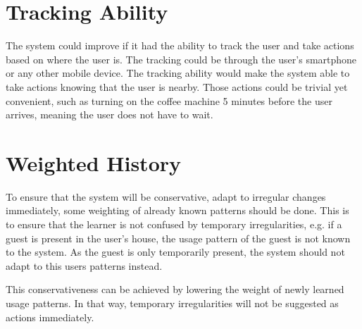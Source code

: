 \section{Tracking Ability}
The system could improve if it had the ability to track the user and take actions based on where the user is. The tracking could be through the user's smartphone or any other mobile device. The tracking ability would make the system able to take actions knowing that the user is nearby. Those actions could be trivial yet convenient, such as turning on the coffee machine 5 minutes before the user arrives, meaning the user does not have to wait.

\section{Weighted History}
To ensure that the system will be conservative, adapt to irregular changes immediately, some weighting of already known patterns should be done. This is to ensure that the learner is not confused by temporary irregularities, e.g. if a guest is present in the user's house, the usage pattern of the guest is not known to the system. As the guest is only temporarily present, the system should not adapt to this users patterns instead. 

This conservativeness can be achieved by lowering the weight of newly learned usage patterns. In that way, temporary irregularities will not be suggested as actions immediately.
